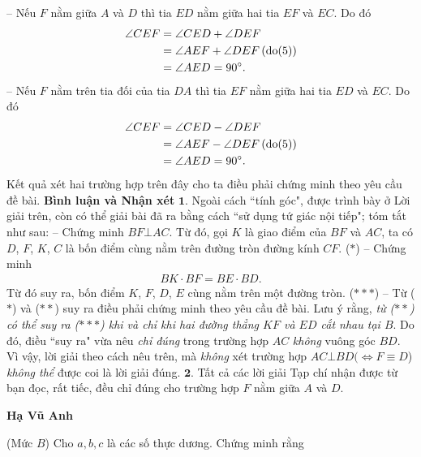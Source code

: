 \begin{multicols}{2}
	-- Nếu $F$ nằm giữa $A$ và $D$ thì tia $ED$ nằm giữa hai tia $EF$ và $EC$. Do đó
	\begin{align*}
			\angle CEF &= \angle CED + \angle DEF\\
			 &= \angle AEF + \angle DEF\left( {{\rm{do}}(5)} \right)\\
			 &= \angle AED = {90^{\circ}}.
	\end{align*}
	-- Nếu $F$ nằm trên tia đối của tia $DA$ thì tia $EF$ nằm giữa hai tia $ED$ và $EC$. Do đó
	\begin{align*}
			\angle CEF &= \angle CED - \angle DEF\\
			 &= \angle AEF - \angle DEF\left( {{\rm{do}}(5)} \right)\\
			 &= \angle AED = {90^{\circ}}.
	\end{align*}
	Kết quả xét hai trường hợp trên đây cho ta điều phải chứng minh theo yêu cầu đề bài.
	\vskip 0.05cm
	\textbf{\color{thachthuctoanhoc}Bình luận và Nhận xét}
	\vskip 0.05cm
	$\pmb{1.}$ Ngoài cách ``tính góc", được trình bày ở Lời giải trên, còn có thể giải bài đã ra bằng cách ``sử dụng tứ giác nội tiếp"; tóm tắt như sau:
	\vskip 0.05cm
	-- Chứng minh $BF \bot  AC$. Từ đó, gọi $K$ là giao điểm của $BF$ và $AC$, ta có $D$, $F$, $K$, $C$ là bốn điểm cùng nằm trên đường tròn đường kính $CF$. \hfill ($*$)
	\vskip 0.05cm
	-- Chứng minh
	\begin{align*}
		BK \cdot BF = BE \cdot BD. \tag{$**$}
	\end{align*}
	Từ đó suy ra, bốn điểm $K$, $F$, $D$, $E$ cùng nằm trên một đường tròn.                                                  \hfill ($***$)
	\vskip 0.05cm
	-- Từ ($*$) và ($**$) suy ra điều phải chứng minh theo yêu cầu đề bài.
	\vskip 0.05cm
	Lưu ý rằng, \textit{từ ($**$) có thể suy ra ($***$) khi và chỉ khi hai đường thẳng $KF$ và $ED$ cắt nhau tại $B$}. Do đó, điều ``suy ra" vừa nêu \textit{chỉ đúng} trong trường hợp $AC$ \textit{không} vuông góc $BD$. Vì vậy, lời giải theo cách nêu trên, mà \textit{không} xét trường hợp $AC \bot  BD (\Leftrightarrow F \equiv D$) \textit{không thể} được coi là lời giải đúng.
	\vskip 0.05cm
	$\pmb{2.}$ Tất cả các lời giải Tạp chí nhận được từ bạn đọc, rất tiếc, đều chỉ đúng cho trường hợp $F$ nằm giữa $A$ và $D$.
	\begin{flushright}
		\textbf{\color{thachthuctoanhoc}Hạ Vũ Anh}
	\end{flushright}
	{}
	(Mức $B$) Cho $a, b, c$ là các số thực dương. Chứng minh rằng
	\begin{align*}

\end{align*}
\end{multicols}
